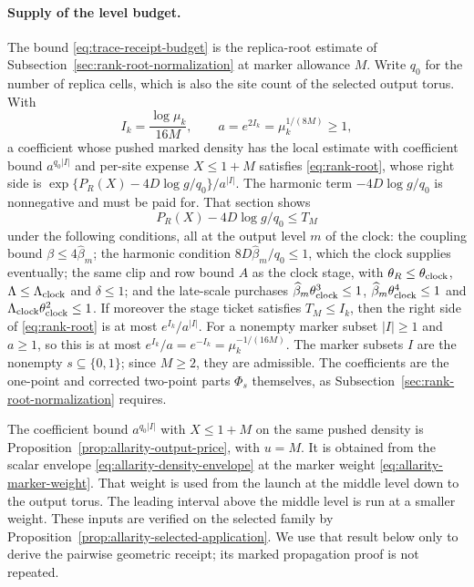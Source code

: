 \paragraph{Supply of the level budget.}
The bound \eqref{eq:trace-receipt-budget} is the replica-root estimate of
Subsection~\ref{sec:rank-root-normalization} at marker allowance $M$. Write
$q_0$ for the number of replica cells, which is also the site count of
the selected output torus. With
\[
 I_k=\frac{\log\mu_k}{16M},\qquad a=e^{2I_k}=\mu_k^{1/(8M)}\ge1 ,
\]
a coefficient whose pushed marked density has the local estimate with
coefficient bound $a^{q_0|I|}$ and per-site expense $X\le1+M$ satisfies
\eqref{eq:rank-root}, whose right side is
$\exp\{P_R(X)-4D\log g/q_0\}/a^{|I|}$. The harmonic term
$-4D\log g/q_0$ is nonnegative and must be paid for. That section shows
\[
 P_R(X)-4D\log g/q_0\le T_M
\]
under the following conditions, all at the output level $m$ of the clock:
the coupling bound $\beta\le4\widehat\beta_m$; the harmonic condition
$8D\widehat\beta_m/q_0\le1$, which the clock supplies eventually; the
same clip and row bound $A$ as the clock stage, with
$\theta_R\le\theta_{\rm clock}$, $\Lambda\le\Lambda_{\rm clock}$ and
$\delta\le1$; and the late-scale purchases
$\widehat\beta_m\theta_{\rm clock}^3\le1$,
$\widehat\beta_m\theta_{\rm clock}^4\le1$ and
$\Lambda_{\rm clock}\theta_{\rm clock}^2\le1$. If moreover the stage ticket
satisfies $T_M\le I_k$, then the right side of \eqref{eq:rank-root} is
at most $e^{I_k}/a^{|I|}$. For a nonempty marker subset $|I|\ge1$ and
$a\ge1$, so this is at most $e^{I_k}/a=e^{-I_k}=\mu_k^{-1/(16M)}$. The
marker subsets $I$ are the nonempty $s\subseteq\{0,1\}$; since
$M\ge2$, they are admissible. The coefficients are the one-point and
corrected two-point parts $\Phi_s$ themselves, as
Subsection~\ref{sec:rank-root-normalization} requires.

The coefficient bound $a^{q_0|I|}$ with $X\le1+M$ on the same pushed
density is Proposition~\ref{prop:allarity-output-price}, with $u=M$. It
is obtained from the scalar envelope \eqref{eq:allarity-density-envelope}
at the marker weight \eqref{eq:allarity-marker-weight}. That weight is
used from the launch at the middle level down to the output torus. The
leading interval above the middle level is run at a smaller weight. These inputs are verified on the selected family by
Proposition~\ref{prop:allarity-selected-application}. We use that result
below only to derive the pairwise geometric receipt; its marked
propagation proof is not repeated.

